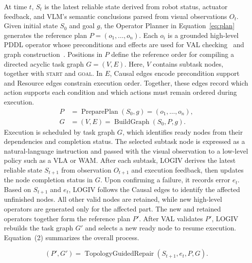 \documentclass[letterpaper,10pt,conference]{ieeeconf}
\newcommand{\method}{LOGIV\xspace}
\begin{document}
At time $t$, $S_t$ is the latest reliable state derived from robot status, actuator feedback, and VLM's semantic conclusions parsed from visual observations $O_t$. Given initial state $S_0$ and goal $g$, the Operator Planner in Equation~\eqref{eq:plan} generates the reference plan $P=(o_1,\ldots,o_n)$. Each $o_i$ is a grounded high-level PDDL operator whose preconditions and effects are used for VAL checking~\cite{howey2004val} and graph construction~\cite{aeronautiques1998pddl}. Positions in $P$ define the reference order for compiling a directed acyclic task graph $G=(V,E)$. Here, $V$ contains subtask nodes, together with \textsc{start} and \textsc{goal}. In $E$, Causal edges encode precondition support and Resource edges constrain execution order. Together, these edges record which action supports each condition and which actions must remain ordered during execution.
\begin{align}
P&=\operatorname{PreparePlan}(S_0,g)=(o_1,\ldots,o_n), \nonumber\\
G&=(V,E)=\operatorname{BuildGraph}(S_0,P,g).
\label{eq:plan}
\end{align}
Execution is scheduled by task graph $G$, which identifies ready nodes from their dependencies and completion status. The selected subtask node is expressed as a natural-language instruction and passed with the visual observation to a low-level policy such as a VLA or WAM. After each subtask, \method{} derives the latest reliable state $S_{t+1}$ from observation $O_{t+1}$ and execution feedback, then updates the node completion status in $G$. Upon confirming a failure, it records error $e_t$. Based on $S_{t+1}$ and $e_t$, \method{} follows the Causal edges to identify the affected unfinished nodes. All other valid nodes are retained, while new high-level operators are generated only for the affected part. The new and retained operators together form the reference plan $P'$. After VAL validates $P'$, \method{} rebuilds the task graph $G'$ and selects a new ready node to resume execution. Equation~(2) summarizes the overall process.

\begin{equation}
(P',G')=\operatorname{TopologyGuidedRepair}(S_{t+1},e_t,P,G).
\end{equation}
\end{document}
